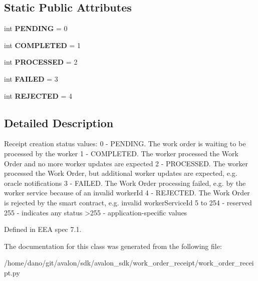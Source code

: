 \subsection*{Static Public Attributes}
\begin{DoxyCompactItemize}
\item 
\mbox{\label{classavalon__sdk_1_1work__order__receipt_1_1work__order__receipt_1_1ReceiptCreateStatus_a872e3cd0fb00ed2c5d49050ab94d51ab}} 
int {\bfseries P\+E\+N\+D\+I\+NG} = 0
\item 
\mbox{\label{classavalon__sdk_1_1work__order__receipt_1_1work__order__receipt_1_1ReceiptCreateStatus_a00fe885585893cba7b39d666b5d570c0}} 
int {\bfseries C\+O\+M\+P\+L\+E\+T\+ED} = 1
\item 
\mbox{\label{classavalon__sdk_1_1work__order__receipt_1_1work__order__receipt_1_1ReceiptCreateStatus_a67ddc537ab9f568fc4927c4e8e39574e}} 
int {\bfseries P\+R\+O\+C\+E\+S\+S\+ED} = 2
\item 
\mbox{\label{classavalon__sdk_1_1work__order__receipt_1_1work__order__receipt_1_1ReceiptCreateStatus_a43ddbd25c1476511bcff44c40409dd72}} 
int {\bfseries F\+A\+I\+L\+ED} = 3
\item 
\mbox{\label{classavalon__sdk_1_1work__order__receipt_1_1work__order__receipt_1_1ReceiptCreateStatus_a11520d38be233799e1cf40b07a7b23bf}} 
int {\bfseries R\+E\+J\+E\+C\+T\+ED} = 4
\end{DoxyCompactItemize}


\subsection{Detailed Description}
\begin{DoxyVerb}Receipt creation status values:
0 - PENDING. The work order is waiting to be processed by the worker
1 - COMPLETED. The worker processed the Work Order and no more worker
    updates are expected
2 - PROCESSED. The worker processed the Work Order, but additional worker
    updates are expected, e.g. oracle notifications
3 - FAILED. The Work Order processing failed, e.g. by the worker service
    because of an invalid workerId
4 - REJECTED. The Work Order is rejected by the smart contract,
    e.g. invalid workerServiceId
5 to 254 - reserved
255 - indicates any status
>255 - application-specific values

Defined in EEA spec 7.1.
\end{DoxyVerb}
 

The documentation for this class was generated from the following file\+:\begin{DoxyCompactItemize}
\item 
/home/dano/git/avalon/sdk/avalon\+\_\+sdk/work\+\_\+order\+\_\+receipt/work\+\_\+order\+\_\+receipt.\+py\end{DoxyCompactItemize}
